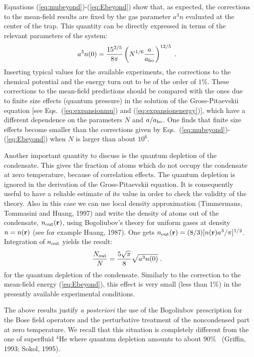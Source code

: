 Equations (\ref{eq:mubeyond})-(\ref{eq:Ebeyond}) show that, as expected, 
the corrections to the mean-field results are fixed by the gas parameter 
$a^3n$ evaluated at the center of the trap. This quantity can be 
directly expressed in terms of the relevant parameters of the system:
\begin{equation}
a^3n(0) = \frac{15^{2/5}}{8\pi}
 \left(N^{1/6}\frac{a}{a_{\rm ho}}\right)^{12/5} \; .
\label{eq:gasparameter}
\end{equation}
Inserting typical values for the available experiments, the corrections 
to the chemical potential and the energy turn out to be of the order 
of $1$\%. These corrections to the mean-field predictions should be 
compared with the ones due to finite size effects (quantum pressure) in 
the solution of the Gross-Pitaevskii equation 
[see Eqs.~(\ref{eq:expansionmu}) and (\ref{eq:expansionenergy})], 
which have a different dependence on the parameters $N$ and $a/a_{\rm ho}$. 
One finds that finite size effects become smaller than the corrections
given by Eqs.~(\ref{eq:mubeyond})-(\ref{eq:Ebeyond}) when $N$ is larger 
than about $10^6$.

Another important quantity to discuss is the quantum depletion of the
condensate. This gives the fraction of atoms which do not occupy the
condensate at zero temperature, because of correlation effects. The quantum
depletion is ignored in the derivation of the Gross-Pitaevskii equation.
It is consequently useful to have a reliable estimate of its value in order
to check the validity of the theory. Also in this case we can use local
density approximation (Timmermans, Tommasini and Huang, 1997) and write 
the density of atoms out of the condensate, $n_{\rm out} ({\bf r})$,
using Bogoliubov's theory for uniform gases at density $n=n({\bf r})$ 
(see for example Huang, 1987). One
gets $n_{\rm out} ({\bf r}) = (8/3) [ n({\bf r}) a^3/ \pi ]^{1/2}$. 
Integration of  $n_{\rm out}$ yields the result:
\begin{equation}
{ N_{\rm out} \over N } = { 5 \sqrt{\pi} \over 8 } \sqrt{a^3n(0)} \; .
\label{eq:depletion}
\end{equation}
for the quantum depletion of the condensate. Similarly to the correction 
to the mean-field energy (\ref{eq:Ebeyond}), this effect is very small
(less than 1\%) in the presently available experimental conditions.

The above results justify {\it a posteriori} the use of the Bogoliubov
prescription for the Bose field operators and the perturbative treatment
of the noncondensed part at zero temperature. We recall that this situation
is completely different from the one of superfluid $^4$He where quantum
depletion amounts to  about 90\% \ (Griffin, 1993; Sokol, 1995).


